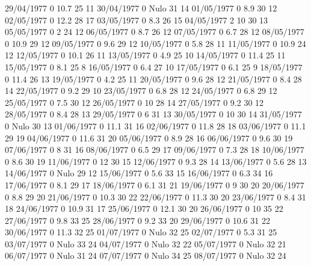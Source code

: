29/04/1977  0      10.7   25     11 
30/04/1977  0     Nulo    31     14 
01/05/1977  0      8.9    30     12 
02/05/1977  0      12.2   28     17 
03/05/1977  0      8.3    26     15 
04/05/1977  2      10     30     13 
05/05/1977  0      2      24     12 
06/05/1977  0      8.7    26     12 
07/05/1977  0      6.7    28     12 
08/05/1977  0      10.9   29     12 
09/05/1977  0      9.6    29     12 
10/05/1977  0      5.8    28     11 
11/05/1977  0      10.9   24     12 
12/05/1977  0      10.1   26     11 
13/05/1977  0      4.9    25     10 
14/05/1977  0      11.4   25     11 
15/05/1977  0      8.1    25     8 
16/05/1977  0      6.4    27     10 
17/05/1977  0      6.1    25     9 
18/05/1977  0      11.4   26     13 
19/05/1977  0      4.2    25     11 
20/05/1977  0      9.6    28     12 
21/05/1977  0      8.4    28     14 
22/05/1977  0      9.2    29     10 
23/05/1977  0      6.8    28     12 
24/05/1977  0      6.8    29     12 
25/05/1977  0      7.5    30     12 
26/05/1977  0      10     28     14 
27/05/1977  0      9.2    30     12 
28/05/1977  0      8.4    28     13 
29/05/1977  0      6      31     13 
30/05/1977  0      10     30     14 
31/05/1977  0     Nulo    30     13 
01/06/1977  0      11.1   31     16 
02/06/1977  0      11.8   28     18 
03/06/1977  0      11.1   29     19 
04/06/1977  0      11.6   31     20 
05/06/1977  0      8.9    28     16 
06/06/1977  0      9.6    30     19 
07/06/1977  0      8      31     16 
08/06/1977  0      6.5    29     17 
09/06/1977  0      7.3    28     18 
10/06/1977  0      8.6    30     19 
11/06/1977  0      12     30     15 
12/06/1977  0      9.3    28     14 
13/06/1977  0      5.6    28     13 
14/06/1977  0     Nulo    29     12 
15/06/1977  0      5.6    33     15 
16/06/1977  0      6.3    34     16 
17/06/1977  0      8.1    29     17 
18/06/1977  0      6.1    31     21 
19/06/1977  0      9      30     20 
20/06/1977  0      8.8    29     20 
21/06/1977  0      10.3   30     22 
22/06/1977  0      11.3   30     20 
23/06/1977  0      8.4    31     18 
24/06/1977  0      10.9   31     17 
25/06/1977  0      12.1   30     20 
26/06/1977  0      10     35     22 
27/06/1977  0      9.8    33     25 
28/06/1977  0      9.2    33     20 
29/06/1977  0      10.6   31     22 
30/06/1977  0      11.3   32     25 
01/07/1977  0     Nulo    32     25 
02/07/1977  0      5.3    31     25 
03/07/1977  0     Nulo    33     24 
04/07/1977  0     Nulo    32     22 
05/07/1977  0     Nulo    32     21 
06/07/1977  0     Nulo    31     24 
07/07/1977  0     Nulo    34     25 
08/07/1977  0     Nulo    32     24 
